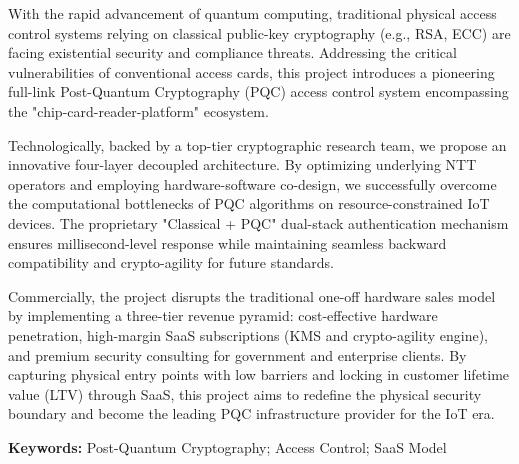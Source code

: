 {\xiaosi\songti

With the rapid advancement of quantum computing, traditional physical access control systems relying on classical public-key cryptography (e.g., RSA, ECC) are facing existential security and compliance threats. Addressing the critical vulnerabilities of conventional access cards, this project introduces a pioneering full-link Post-Quantum Cryptography (PQC) access control system encompassing the "chip-card-reader-platform" ecosystem.

Technologically, backed by a top-tier cryptographic research team, we propose an innovative four-layer decoupled architecture. By optimizing underlying NTT operators and employing hardware-software co-design, we successfully overcome the computational bottlenecks of PQC algorithms on resource-constrained IoT devices. The proprietary "Classical + PQC" dual-stack authentication mechanism ensures millisecond-level response while maintaining seamless backward compatibility and crypto-agility for future standards.

Commercially, the project disrupts the traditional one-off hardware sales model by implementing a three-tier revenue pyramid: cost-effective hardware penetration, high-margin SaaS subscriptions (KMS and crypto-agility engine), and premium security consulting for government and enterprise clients. By capturing physical entry points with low barriers and locking in customer lifetime value (LTV) through SaaS, this project aims to redefine the physical security boundary and become the leading PQC infrastructure provider for the IoT era.

\vspace{2em}

\noindent \textbf{Keywords: } Post-Quantum Cryptography; Access Control; SaaS Model

}